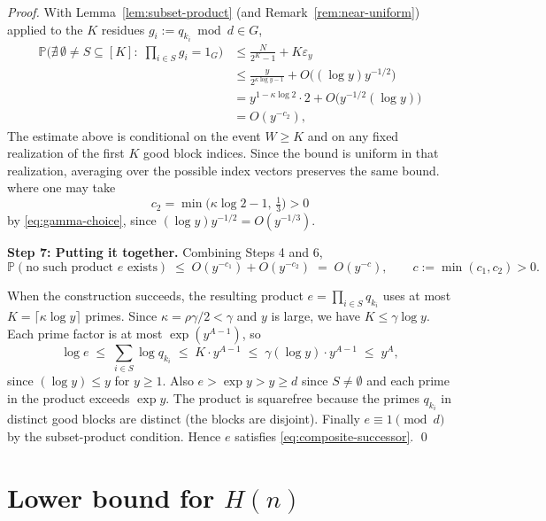 \documentclass[11pt,reqno]{amsart}
\theoremstyle{plain}
\theoremstyle{definition}
\newcommand{\PP}{\mathbb{P}}
\newcommand{\eps}{\varepsilon}
\begin{document}
\begin{proof}
With Lemma~\ref{lem:subset-product} (and Remark~\ref{rem:near-uniform}) applied
to the $K$ residues $g_i:=q_{k_i}\bmod d\in G$,
\begin{align}
\PP\bigl(\nexists\,\emptyset\ne S\subseteq[K]:\;\textstyle\prod_{i\in S}g_i=1_G\bigr)
&\le \frac{N}{2^K-1} + K\eps_y\nonumber\\
&\le \frac{y}{2^{\kappa\log y - 1}} + O\bigl((\log y)y^{-1/2}\bigr)\nonumber\\
&= y^{1-\kappa\log 2}\cdot 2 + O\bigl(y^{-1/2}(\log y)\bigr)\nonumber\\
&= O(y^{-c_2}), \label{eq:subset-prob}
\end{align}
The estimate above is conditional on the event $W\ge K$ and on any fixed
realization of the first $K$ good block indices. Since the bound is uniform in
that realization, averaging over the possible index vectors preserves the same
bound.
where one may take
\[
c_2=\min\bigl(\kappa\log 2-1,\,\tfrac13\bigr)>0
\]
by \eqref{eq:gamma-choice}, since
$(\log y)y^{-1/2}=O(y^{-1/3})$.

\medskip\noindent
\textbf{Step 7: Putting it together.} Combining Steps 4 and 6,
\begin{equation}\label{eq:total-prob}
\PP(\text{no such product $e$ exists}) \;\le\; O(y^{-c_1})+O(y^{-c_2})\;=\;O(y^{-c}),
\qquad c:=\min(c_1,c_2)>0.
\end{equation}

When the construction succeeds, the resulting product
$e=\prod_{i\in S}q_{k_i}$ uses at most $K=\lceil\kappa\log y\rceil$ primes.
Since $\kappa=\rho\gamma/2<\gamma$ and $y$ is large, we have
$K\le \gamma\log y$. Each prime factor is at most $\exp(y^{A-1})$, so
\begin{equation}\label{eq:e-size}
\log e
\;\le\;
\sum_{i\in S}\log q_{k_i}
\;\le\;
K\cdot y^{A-1}
\;\le\;
\gamma(\log y)\cdot y^{A-1}
\;\le\;
y^A,
\end{equation}
since $(\log y)\le y$ for $y\ge 1$. Also $e>\exp y>y\ge d$ since $S\ne\emptyset$
and each prime in the product exceeds $\exp y$. The product is squarefree
because the primes $q_{k_i}$ in distinct good blocks are distinct (the blocks
are disjoint). Finally $e\equiv 1\pmod d$ by the subset-product condition.
Hence $e$ satisfies \eqref{eq:composite-successor}. \qed
\end{proof}

\section{Lower bound for $H(n)$}\label{sec:lower-H}
\end{document}
